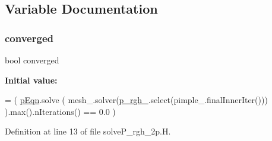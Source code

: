 \subsection{Variable Documentation}
\mbox{\label{solveP__rgh__2p_8H_afcd780f72325f856f84ec1de84464211}} 
\subsubsection{\texorpdfstring{converged}{converged}}
{\footnotesize\ttfamily bool converged}

{\bfseries Initial value\+:}
\begin{DoxyCode}
=
( 
    \hyperlink{solveP__rgh__2p_8H_a2181bb507e6192fba9adef805bdb5892}{pEqn}.solve
    (
        mesh\_.solver(\hyperlink{updatePP__rghRho__1p_8H_a320090d1a3c1675778a59e981765c77c}{p\_rgh\_}.select(pimple\_.finalInnerIter()))
    ).max().nIterations()
==  0.0 
)
\end{DoxyCode}


Definition at line 13 of file solve\+P\+\_\+rgh\+\_\+2p.\+H.

